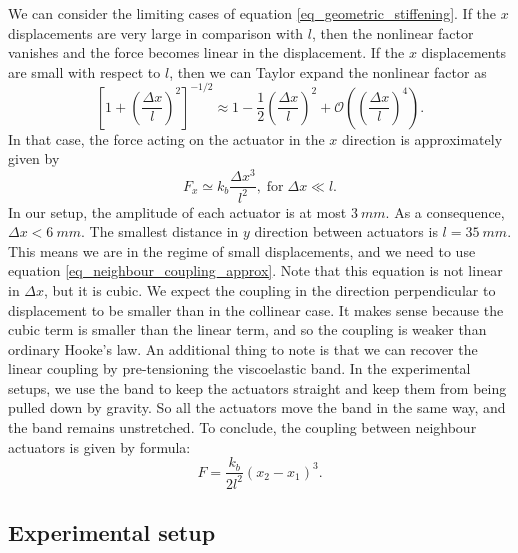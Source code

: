 \documentclass[11pt, a4paper]{article} %
\begin{document}
We can consider the limiting cases of equation \eqref{eq_geometric_stiffening}. If the $x$ displacements are 
very large in comparison with $l$, then the nonlinear factor vanishes and the force becomes linear in the displacement. 
If the $x$ displacements are small with respect to $l$, then we can Taylor expand the nonlinear factor as
\begin{equation}
\left[1+ \left(\frac{\varDelta x}{l}\right)^2\right]^{-1/2} \approx 1 - \frac{1}{2}\left(\frac{\varDelta x}{l}\right)^2 + \mathcal{O}\left(\left(\frac{\varDelta x}{l}\right)^4\right).
\end{equation} 
In that case, the force acting on the actuator in the $x$ direction is approximately given by
\begin{equation}
    F_x \simeq  k_b \frac{\varDelta x ^3}{l^2}, \; \text{for} \; \varDelta x \ll l.
    \label{eq_neighbour_coupling_approx}
\end{equation}
In our setup, the amplitude of each actuator is at most $\SI{3}{mm}$. As a consequence, $\varDelta x < \SI{6}{mm}$. 
The smallest distance in $y$ direction between actuators is $l = \SI{35}{mm}$. 
This means we are in the regime of small displacements, and we need to use equation \eqref{eq_neighbour_coupling_approx}.
Note that this equation is not linear in $\varDelta x$, but it is cubic. We expect the coupling in the direction perpendicular 
to displacement to be smaller than in the collinear case. It makes sense because the cubic term is smaller than the 
linear term, and so the coupling is weaker than ordinary Hooke's law. 
An additional thing to note is that we can recover the linear coupling by pre-tensioning the viscoelastic band. 
In the experimental setups, we use the band to keep the actuators straight and keep them from being pulled down by gravity. 
So all the actuators move the band in the same way, and the band remains unstretched. To conclude, the coupling between 
neighbour actuators is given by formula:
\begin{equation}
    F = \frac{k_b}{2l^2} (x_2 - x_1)^3.
\end{equation}

\subsection{Experimental setup}
\label{subsec:experimental}
\end{document}
